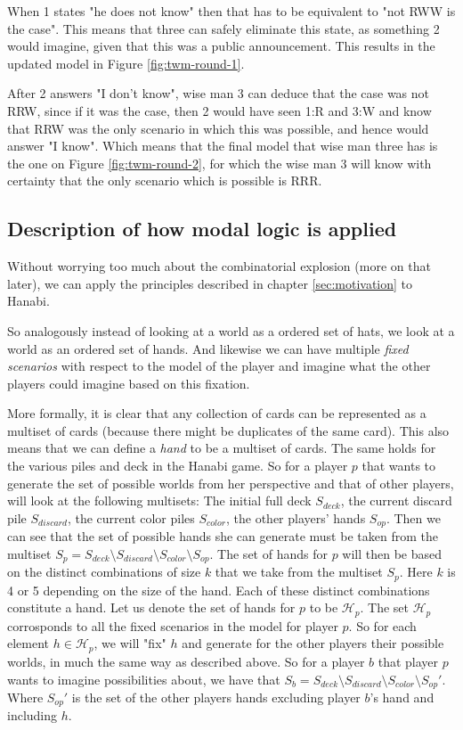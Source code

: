 When 1 states "he does not know" then that has to be equivalent to "not RWW is the case". This means that three can safely eliminate this state, as something 2 would imagine, given that this was a public announcement. This results in the updated model in Figure \ref{fig:twm-round-1}.


After 2 answers "I don't know", wise man 3 can deduce that the case was not RRW, since if it was the case, then 2 would have seen 1:R and 3:W and know that RRW was the only scenario in which this was possible, and hence would answer "I know". Which means that the final model that wise man three has is the one on Figure \ref{fig:twm-round-2}, for which the wise man 3 will know with certainty that the only scenario which is possible is RRR.


\subsection{Description of how modal logic is applied} \label{sec:description-of-how-modal-logic-is_applied}
Without worrying too much about the combinatorial explosion (more on that later), we can apply the principles described in chapter \ref{sec:motivation} to Hanabi. 

So analogously instead of looking at a world as a ordered set of hats, we look at a world as an ordered set of hands. And likewise we can have multiple \emph{fixed scenarios} with respect to the model of the player and imagine what the other players could imagine based on this fixation. 

More formally, it is clear that any collection of cards can be represented as a multiset of cards (because there might be duplicates of the same card). This also means that we can define a \emph{hand} to be a multiset of cards. The same holds for the various piles and deck in the Hanabi game.  
So for a player $p$ that wants to generate the set of possible worlds from her perspective and that of other players, will look at the following multisets:
The initial full deck $S_{deck}$, the current discard pile $S_{discard}$, the current color piles $S_{color}$, the other players' hands $S_{op}$. 
Then we can see that the set of possible hands she can generate must be taken from the multiset $S_{p} = S_{deck} \setminus S_{discard} \setminus S_{color} \setminus S_{op}$. 
The set of hands for $p$ will then be based on the distinct combinations of size $k$ that we take from the multiset $S_{p}$.
Here $k$ is 4 or 5 depending on the size of the hand.
Each of these distinct combinations constitute a hand.
Let us denote the set of hands for $p$ to be $\mathcal{H}_p$. The set $\mathcal{H}_p$ corrosponds to all the fixed scenarios in the model for player $p$.
So for each element $h \in \mathcal{H}_p$, we will "fix" $h$ and generate for the other players their possible worlds, in much the same way as described above. So for a player $b$ that player $p$ wants to imagine possibilities about, we have that $S_{b} = S_{deck} \setminus S_{discard} \setminus S_{color} \setminus S_{op}'$. Where $S_{op}'$ is the set of the other players hands excluding player $b$'s hand and including $h$. 


